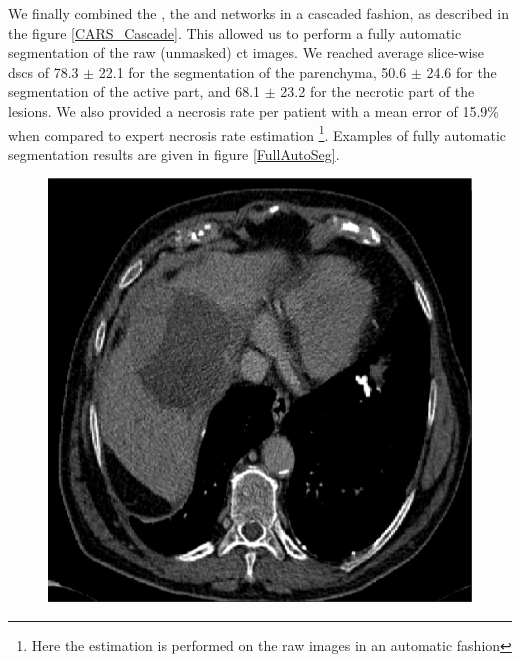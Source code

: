 We finally combined the , the  and  networks in a cascaded fashion, as described in the figure \ref{CARS_Cascade}. This allowed us to perform a fully automatic segmentation of the raw (unmasked) \ac{ct} images. We reached average slice-wise \ac{dsc}s of 78.3 $\pm$ 22.1 for the segmentation of the parenchyma, 50.6 $\pm$ 24.6  for the segmentation of the active part, and 68.1 $\pm$ 23.2 for the necrotic part of the lesions. We also provided a necrosis rate per patient with a mean error of 15.9\% when compared to expert necrosis rate estimation \footnote{Here the estimation is performed on the raw images in an automatic fashion}. Examples of fully automatic segmentation results are given in figure \ref{FullAutoSeg}.

\begin{figure}[!ht]
   \centering
\begin{minipage}{4cm}
\includegraphics[width=\linewidth]{../SemanticSeg/images/1_7_raw_new_resized}
\end{minipage} \hspace{-0.3cm}
\begin{minipage}{4cm}

\end{minipage}
\end{figure}
